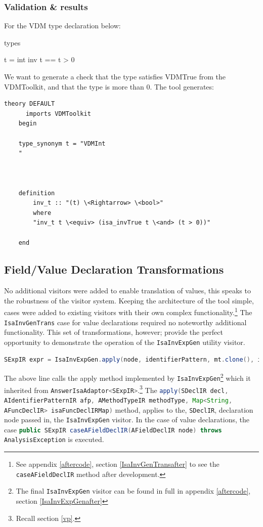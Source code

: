 	\subsubsection{Validation \& results}
	For the VDM type declaration below:
	\begin{vdmsl}
	types

	t = int
	inv t == t > 0
	\end{vdmsl}
	We want to generate a check that the type satisfies VDMTrue from the VDMToolkit, and that the type is more than 0. The tool generates:
	\begin{lstlisting}[language=Isabelle]
	theory DEFAULT
	  imports VDMToolkit
	begin

	type_synonym t = "VDMInt
	"



	definition
		inv_t :: "(t) \<Rightarrow> \<bool>"
	    where
	    "inv_t t \<equiv> (isa_invTrue t \<and> (t > 0))"

	end
	\end{lstlisting}

	\subsection{Field/Value Declaration Transformations}
	No additional visitors were added to enable translation of values, this speaks to the robustness of the visitor system. Keeping the architecture of the tool simple, cases were added to existing visitors with their own complex functionality.\footnote{See appendix \ref{aftercode}, section \ref{IsaInvGenTransafter} to see the \lstinline[language=Java]{caseAFieldDeclIR} method after development.} The \lstinline[language=Java]{IsaInvGenTrans} case for value declarations required no noteworthy additional functionality. This set of transformations, however; provide the perfect opportunity to demonstrate the operation of the \lstinline[language=Java]{IsaInvExpGen} utility visitor. 
	\begin{lstlisting}[language=Java]
	SExpIR expr = IsaInvExpGen.apply(node, identifierPattern, mt.clone(), isaFuncDeclIRMap);
	\end{lstlisting}
	The above line calls the apply method implemented by \lstinline[language=Java]{IsaInvExpGen}\footnote{The final \lstinline[language=Java]{IsaInvExpGen} visitor can be found in full in appendix \ref{aftercode}, section \ref{IsaInvExpGenafter}} which it inherited from \lstinline[language=Java]{AnswerIsaAdaptor<SExpIR>}.\footnote{Recall section \ref{vp}.} The \lstinline[language=Java]{apply(SDeclIR decl, AIdentifierPatternIR afp, AMethodTypeIR methodType, Map<String, AFuncDeclIR> isaFuncDeclIRMap)} method, applies to the, \lstinline[language=Java]{SDeclIR}, declaration node passed in, the \lstinline[language=Java]{IsaInvExpGen} visitor. In the case of value declarations, the case \lstinline[language=Java]{public SExpIR caseAFieldDeclIR(AFieldDeclIR node) throws AnalysisException} is executed. 

